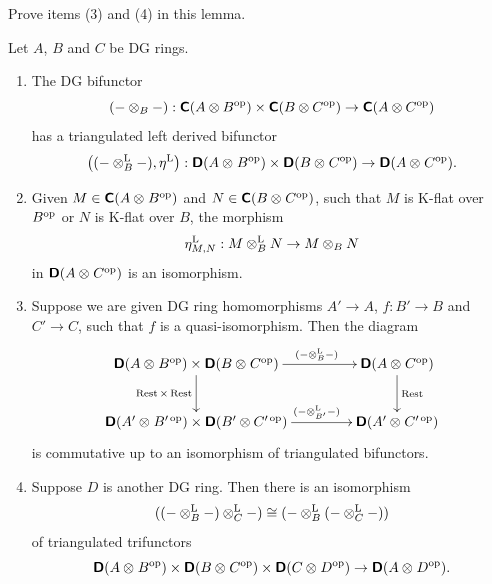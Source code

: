 \begin{exer} \label{exer:3445}
Prove items (3) and (4) in this lemma. 
\end{exer}

\begin{prop} \label{prop:3450}
Let $A$, $B$ and $C$ be DG rings.
\begin{enumerate}
\item The DG bifunctor 
\[ (- \otimes_{B} -) :  \boldsymbol{\mathsf{C}}(A \otimes B^{\mathrm{op}}) \times 
\boldsymbol{\mathsf{C}}(B \otimes C^{\mathrm{op}}) \to \boldsymbol{\mathsf{C}}(A \otimes C^{\mathrm{op}})  \]
has a triangulated left derived bifunctor 
\[ \bigl(  (- \otimes^{\mathrm{L}}_{B} -), \eta^{\mathrm{L}} \bigr) :  
\boldsymbol{\mathsf{D}}(A \otimes_{} B^{\mathrm{op}}) \times 
\boldsymbol{\mathsf{D}}(B \otimes_{} C^{\mathrm{op}}) \to \boldsymbol{\mathsf{D}}(A \otimes_{} C^{\mathrm{op}}) . \]

\item Given $M \in \boldsymbol{\mathsf{C}}(A \otimes_{} B^{\mathrm{op}})$
and 
$N \in \boldsymbol{\mathsf{C}}(B \otimes_{} C^{\mathrm{op}})$,
such that $M$ is K-flat over $B^{\mathrm{op}}$ or $N$ is K-flat over $B$, the 
morphism 
\[ \eta^{\mathrm{L}}_{M, N} : M \otimes_B^{\mathrm{L}} N \to M \otimes_{B} N \]
in $\boldsymbol{\mathsf{D}}(A \otimes_{} C^{\mathrm{op}})$ is an isomorphism. 

\item Suppose we are given DG ring homomorphisms 
$A' \to A$, $f : B' \to B$ and $C' \to C$, such that $f$ is a 
quasi-isomorphism. 
Then the diagram 
\[ \UseTips \xymatrix @C=10ex @R=6ex {
\dcat{D}(A \ot_{} B^{\mrm{op}}) \times \dcat{D}(B \ot_{} C^{\mrm{op}})
\ar[r]^(0.6){ (- \ot^{\mrm{L}}_{B} -) }
\ar[d]_{\opn{Rest} \times \opn{Rest}}
&
\dcat{D}(A \ot_{} C^{\mrm{op}})
\ar[d]^{\opn{Rest}}
\\
\dcat{D}(A' \ot_{} B'^{\, \mrm{op}}) \times \dcat{D}(B' \ot C'^{\, \mrm{op}})
\ar[r]^(0.6){ (- \ot^{\mrm{L}}_{B'} -) }
&
\dcat{D}(A' \ot_{} C'^{\, \mrm{op}})
} \]
is commutative up to an isomorphism of triangulated bifunctors. 

\item Suppose $D$ is another DG ring. Then there is an isomorphism  
\[ ((- \otimes^{\mathrm{L}}_{B} -) \otimes^{\mathrm{L}}_{C} -) \cong 
(- \otimes^{\mathrm{L}}_{B} (- \otimes^{\mathrm{L}}_{C} -)) \]
of triangulated trifunctors 
\[ \boldsymbol{\mathsf{D}}(A \otimes_{} B^{\mathrm{op}}) \times \boldsymbol{\mathsf{D}}(B \otimes_{} C^{\mathrm{op}}) 
\times 
\boldsymbol{\mathsf{D}}(C \otimes_{} D^{\mathrm{op}}) \to \boldsymbol{\mathsf{D}}(A \otimes_{} D^{\mathrm{op}}) . \]
\end{enumerate}
\end{prop}

